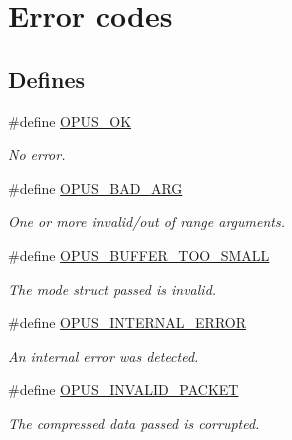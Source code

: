 \hypertarget{group__opus__errorcodes}{
\section{Error codes}
\label{group__opus__errorcodes}
}
\subsection*{Defines}
\begin{DoxyCompactItemize}
\item 
\#define \hyperlink{group__opus__errorcodes_gaa44cf8a185e1b5cb940ef63eb4f02d21}{OPUS\_\-OK}
\begin{DoxyCompactList}\small\item\em No error. \item\end{DoxyCompactList}\item 
\#define \hyperlink{group__opus__errorcodes_gaf2d43e479455a1a3b6874e5faf4e827d}{OPUS\_\-BAD\_\-ARG}
\begin{DoxyCompactList}\small\item\em One or more invalid/out of range arguments. \item\end{DoxyCompactList}\item 
\#define \hyperlink{group__opus__errorcodes_gacd897c05563ec04a67d8e92ba29f3d4f}{OPUS\_\-BUFFER\_\-TOO\_\-SMALL}
\begin{DoxyCompactList}\small\item\em The mode struct passed is invalid. \item\end{DoxyCompactList}\item 
\#define \hyperlink{group__opus__errorcodes_gae1f952c366ebd380df9efa1842635a0b}{OPUS\_\-INTERNAL\_\-ERROR}
\begin{DoxyCompactList}\small\item\em An internal error was detected. \item\end{DoxyCompactList}\item 
\#define \hyperlink{group__opus__errorcodes_ga46fc9dd493fb8e291bd8e838f0988bb7}{OPUS\_\-INVALID\_\-PACKET}
\begin{DoxyCompactList}\small\item\em The compressed data passed is corrupted. \item\end{DoxyCompactList}\item 

\end{DoxyCompactItemize}
